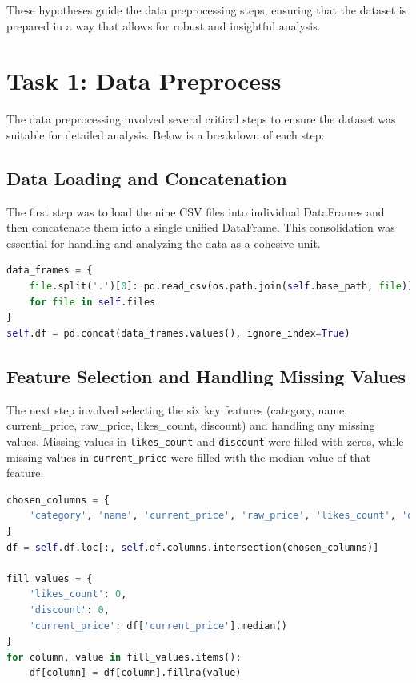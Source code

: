\documentclass[a4paper,11pt]{article}
\begin{document}
These hypotheses guide the data preprocessing steps, ensuring that the dataset is prepared in a way that allows for robust and insightful analysis.

\section{Task 1: Data Preprocess}

The data preprocessing involved several critical steps to ensure the dataset was suitable for detailed analysis. Below is a breakdown of each step:

\subsection{Data Loading and Concatenation}

The first step was to load the nine CSV files into individual DataFrames and then concatenate them into a single unified DataFrame. This consolidation was essential for handling and analyzing the data as a cohesive unit.

\begin{lstlisting}[language=Python]
data_frames = {
    file.split('.')[0]: pd.read_csv(os.path.join(self.base_path, file))
    for file in self.files
}
self.df = pd.concat(data_frames.values(), ignore_index=True)
\end{lstlisting}

\subsection{Feature Selection and Handling Missing Values}

The next step involved selecting the six key features (category, name, current\_price, raw\_price, likes\_count, discount) and handling any missing values. Missing values in \texttt{likes\_count} and \texttt{discount} were filled with zeros, while missing values in \texttt{current\_price} were filled with the median value of that feature.

\begin{lstlisting}[language=Python]
chosen_columns = {
    'category', 'name', 'current_price', 'raw_price', 'likes_count', 'discount'
}
df = self.df.loc[:, self.df.columns.intersection(chosen_columns)]

fill_values = {
    'likes_count': 0,
    'discount': 0,
    'current_price': df['current_price'].median()
}
for column, value in fill_values.items():
    df[column] = df[column].fillna(value)
\end{lstlisting}
\end{document}
